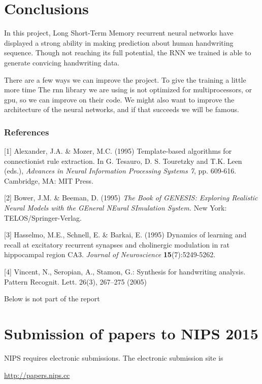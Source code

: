 \documentclass{article} %
\begin{document}
\section{Conclusions}
In this project, Long Short-Term Memory recurrent neural networks have displayed a strong ability in making prediction about human handwriting sequence. Though not reaching its full potential, the RNN we trained is able to generate convicing handwriting data. 

There are a few ways we can improve the project. 
To give the training a little more time
The rnn library we are using is not optimized for multiprocessors, or gpu, so we can improve on their code. 
We might also want to improve the architecture of the neural networks, and if that succeeds we will be famous. 


\subsubsection*{References}

\small{
[1] Alexander, J.A. \& Mozer, M.C. (1995) Template-based algorithms
for connectionist rule extraction. In G. Tesauro, D. S. Touretzky
and T.K. Leen (eds.), {\it Advances in Neural Information Processing
Systems 7}, pp. 609-616. Cambridge, MA: MIT Press.

[2] Bower, J.M. \& Beeman, D. (1995) {\it The Book of GENESIS: Exploring
Realistic Neural Models with the GEneral NEural SImulation System.}
New York: TELOS/Springer-Verlag.

[3] Hasselmo, M.E., Schnell, E. \& Barkai, E. (1995) Dynamics of learning
and recall at excitatory recurrent synapses and cholinergic modulation
in rat hippocampal region CA3. {\it Journal of Neuroscience}
{\bf 15}(7):5249-5262.
}

[4] Vincent, N., Seropian, A., Stamon, G.: Synthesis for handwriting
analysis. Pattern Recognit. Lett. 26(3), 267–275 (2005)



Below is not part of the report

\section{Submission of papers to NIPS 2015}

NIPS requires electronic submissions.  The electronic submission site is  
\begin{center}
   \url{http://papers.nips.cc}
\end{center}
\end{document}
